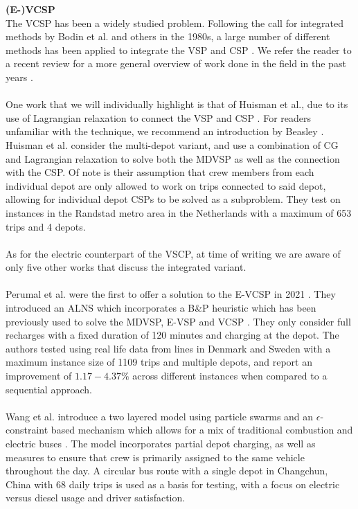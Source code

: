 \documentclass[]{article}
\begin{document}
\noindent \textbf{(E-)VCSP}\\
The VCSP has been a widely studied problem. Following the call for integrated methods by Bodin et al. and others in the 1980s, a large number of different methods has been applied to integrate the VSP and CSP \cite{Bodin1983}. We refer the reader to a recent review for a more general overview of work done in the field in the past years \cite{Ge2024}. \\\\
One work that we will individually highlight is that of Huisman et al., due to its use of Lagrangian relaxation to connect the VSP and CSP \cite{Huisman2005}. For readers unfamiliar with the technique, we recommend an introduction by Beasley \cite{Beasley1993}. Huisman et al. consider the multi-depot variant, and use a combination of CG and Lagrangian relaxation to solve both the MDVSP as well as the connection with the CSP. Of note is their assumption that crew members from each individual depot are only allowed to work on trips connected to said depot, allowing for individual depot CSPs to be solved as a subproblem. They test on instances in the Randstad metro area in the Netherlands with a maximum of 653 trips and 4 depots. \\\\ 
As for the electric counterpart of the VSCP, at time of writing we are aware of only five other works that discuss the integrated variant. \\\\
Perumal et al. were the first to offer a solution to the E-VCSP in 2021
\cite{Perumal2021}. They introduced an ALNS which incorporates a B\&P heuristic
which has been previously used to solve the MDVSP, E-VSP and VCSP
\cite{Pepin2009, Haase1996, vanKootenNiekerk2017}. They only consider full recharges with a fixed duration of
120 minutes and charging at the depot. The
authors tested using real life data from lines in Denmark and Sweden with a
maximum instance size of 1109 trips and multiple depots, and report an improvement of $1.17-4.37\%$
across different instances when compared to a sequential approach. \\\\

Wang et al. introduce a two layered model using particle swarms and an
$\epsilon$-constraint based mechanism which allows for a mix of traditional
combustion and electric buses \cite{Wang2022}. The model incorporates partial
depot charging, as well as measures to ensure that crew is primarily assigned to
the same vehicle throughout the day. A circular bus route with a single depot in Changchun, China
with 68 daily trips is used as a basis for testing, with a focus on electric
versus diesel usage and driver satisfaction. \\\\
\end{document}

